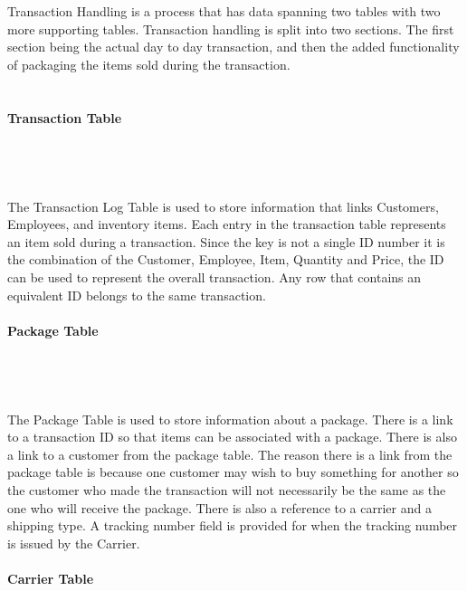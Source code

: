 \documentclass{report}
\begin{document}
    Transaction Handling is a process that has data spanning two tables with two more supporting
    tables. Transaction handling is split into two sections. The first section being the actual
    day to day transaction, and then the added functionality of packaging the items sold during
    the transaction.\\
    \\
    \\
    {\bf Transaction Table}\\
    \\
    \\
    \\
    \\
    The Transaction Log Table is used to store information that links Customers, Employees, and
    inventory items. Each entry in the transaction table represents an item sold during a transaction.
    Since the key is not a single ID number it is the combination of the Customer, Employee, Item,
    Quantity and Price, the ID can be used to represent the overall transaction. Any row that contains
    an equivalent ID belongs to the same transaction.
    \\
    \\
    {\bf Package Table}\\
    \\
    \\
    \\
    \\
    The Package Table is used to store information about a package. There is a link to a transaction ID
    so that items can be associated with a package. There is also a link to a customer from the package
    table. The reason there is a link from the package table is because one customer may wish to buy
    something for another so the customer who made the transaction will not necessarily be the same as
    the one who will receive the package. There is also a reference to a carrier and a shipping type.
    A tracking number field is provided for when the tracking number is issued by the Carrier.
    \\
    \\
    {\bf Carrier Table}\\
    \\
    \\
\end{document}
